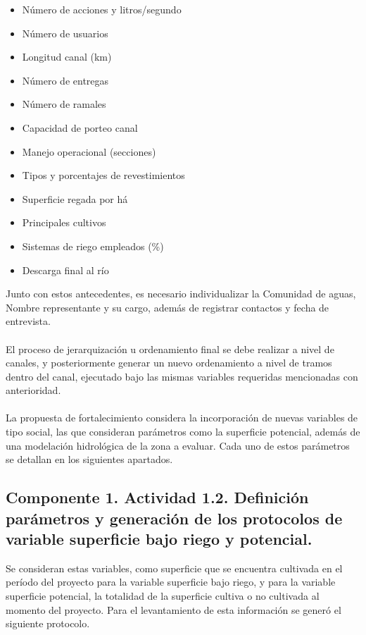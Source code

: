 \documentclass[]{article}
\begin{document}
\begin{itemize}
\item Número de acciones y litros/segundo
\item Número de usuarios
\item Longitud canal (km)
\item Número de entregas
\item Número de ramales
\item Capacidad de porteo canal
\item Manejo operacional (secciones)
\item Tipos y porcentajes de revestimientos
\item Superficie regada por há
\item Principales cultivos
\item Sistemas de riego empleados (\%)
\item Descarga final al río
\end{itemize}

Junto con estos antecedentes, es necesario individualizar la Comunidad de aguas, Nombre representante y su cargo, además de registrar contactos y fecha de entrevista.\\
\\
El proceso de jerarquización u ordenamiento final se debe realizar a nivel de canales, y posteriormente generar un nuevo ordenamiento a nivel de tramos dentro del canal, ejecutado bajo las mismas variables requeridas mencionadas con anterioridad.\\
\\
La propuesta de fortalecimiento considera la incorporación de nuevas variables de tipo social, las que consideran parámetros como la superficie potencial, además de una modelación hidrológica de la zona a evaluar. Cada uno de estos parámetros se detallan en los siguientes apartados.

\subsection{Componente 1. Actividad 1.2. Definición parámetros y generación de los protocolos de variable superficie bajo riego y potencial.}

Se consideran estas variables, como superficie que se encuentra cultivada en el período del proyecto para la variable superficie bajo riego, y para la variable superficie potencial, la totalidad de la superficie cultiva o no cultivada al momento del proyecto. Para el levantamiento de esta información se generó el siguiente protocolo.
\end{document}
